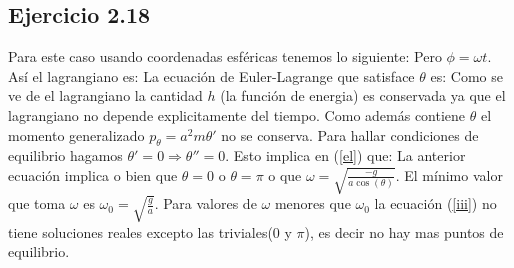 \subsection*{Ejercicio 2.18}
Para este caso usando coordenadas esf\'ericas tenemos lo siguiente:
Pero $\phi=\omega t$. As\'i el lagrangiano es:
La ecuaci\'on de Euler-Lagrange que satisface $\theta$ es:
Como se ve de el lagrangiano la cantidad  $h$ (la funci\'on de energia) es conservada ya que el lagrangiano no depende explicitamente del tiempo. Como adem\'as contiene  $\theta$ el momento generalizado $p_\theta=a^2 m \theta '$ no se conserva.
Para hallar condiciones de equilibrio hagamos $\theta'=0\Longrightarrow \theta''=0$. Esto implica en (\ref{el}) que:
La anterior ecuaci\'on implica o bien que $\theta=0$ o $\theta=\pi$ o que $\omega=\sqrt{\frac{-g}{a \cos(\theta)}}$. El m\'inimo valor que toma $\omega$ es $\omega_0=\sqrt{\frac{g}{a}}$. Para valores de $\omega$ menores que $\omega_0$ la ecuaci\'on (\ref{iii}) no tiene soluciones reales excepto las triviales(0 y $\pi$), es decir no hay mas puntos de equilibrio.

